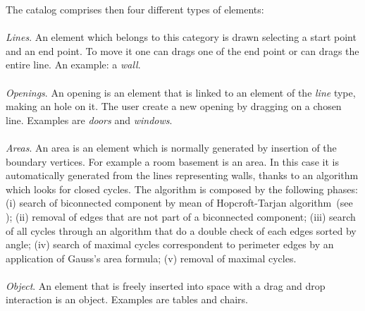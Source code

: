 The catalog comprises then four different types of elements:\\\\
\noindent \emph{Lines}. An element which belongs to this category is drawn selecting a start point and an end point. To move it one can drags one of the end point or can drags the entire line. An example: a \emph{wall}.\\\\
\noindent \emph{Openings}. An opening is an element that is linked to an element of the \emph{line} type, making an hole on it. The user create a new opening by dragging on a chosen line. Examples are \emph{doors} and \emph{windows}.\\\\
\noindent \emph{Areas}. An area is an element which is normally generated by insertion of the boundary vertices. For example a room basement is an area. In this case it is automatically generated from the lines representing walls, thanks to an algorithm which looks for closed cycles. The algorithm is composed by the following phases: (i) search of biconnected component by mean of Hopcroft-Tarjan algorithm~(see \cite{Hopcroft:1973:AEA:362248.362272}); (ii) removal of edges that are not part of a biconnected component; (iii) search of all cycles through an algorithm that do a double check of each edges sorted by angle; (iv) search of maximal cycles correspondent to perimeter edges by an application of Gauss's area formula; (v) removal of maximal cycles.\\\\
\noindent \emph{Object}. An element that is freely inserted into space with a drag and drop interaction is an object. Examples are tables and chairs.\\\





